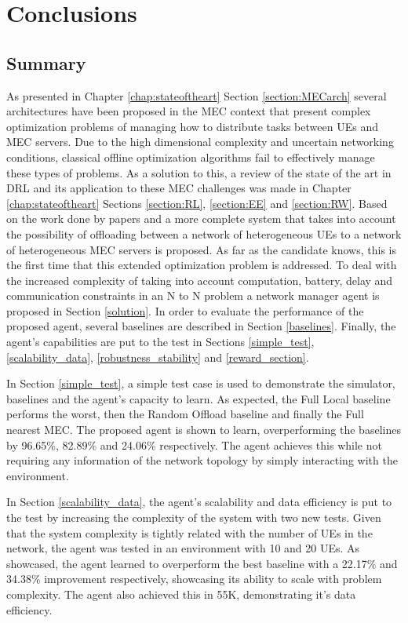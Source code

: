 \chapter{Conclusions}
\section{Summary}
\noindent As presented in Chapter \ref{chap:stateoftheart} Section \ref{section:MECarch} several architectures have been proposed in the \acrshort{MEC} context that present complex optimization problems of managing how to distribute tasks between \acrshort{UE}s and \acrshort{MEC} servers. Due to the high dimensional complexity and uncertain networking conditions, classical offline optimization algorithms fail to effectively manage these types of problems. As a solution to this, a review of the state of the art in \acrshort{DRL} and its application to these \acrshort{MEC} challenges was made in Chapter \ref{chap:stateoftheart} Sections \ref{section:RL}, \ref{section:EE} and \ref{section:RW}. Based on the work done by papers \cite{NUE1mec} and \cite{taskclass1} a more complete system that takes into account the possibility of offloading between a network of heterogeneous \acrshort{UE}s to a network of heterogeneous \acrshort{MEC} servers is proposed. As far as the candidate knows, this is the first time that this extended optimization problem is addressed. To deal with the increased complexity of taking into account computation, battery, delay and communication constraints in an N to N problem a network manager agent is proposed in Section \ref{solution}. In order to evaluate the performance of the proposed agent, several baselines are described in Section \ref{baselines}. Finally, the agent's capabilities are put to the test in Sections \ref{simple_test}, \ref{scalability_data}, \ref{robustness_stability} and \ref{reward_section}.

In Section \ref{simple_test}, a simple test case is used to demonstrate the simulator, baselines and the agent's capacity to learn. As expected, the Full Local baseline performs the worst, then the Random Offload baseline and finally the Full nearest MEC. The proposed agent is shown to learn, overperforming the baselines by 96.65\%, 82.89\% and 24.06\% respectively. The agent achieves this while not requiring any information of the network topology by simply interacting with the environment.

In Section \ref{scalability_data}, the agent's scalability and data efficiency is put to the test by increasing the complexity of the system with two new tests. Given that the system complexity is tightly related with the number of \acrshort{UE}s in the network, the agent was tested in an environment with 10 and 20 \acrshort{UE}s. As showcased, the agent learned to overperform the best baseline with a 22.17\% and 34.38\% improvement respectively, showcasing its ability to scale with problem complexity. The agent also achieved this in 55K, demonstrating it's data efficiency.

